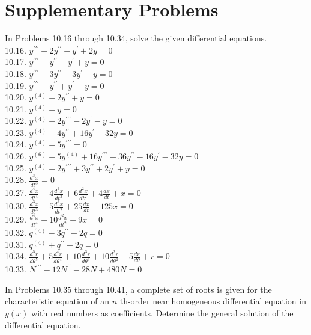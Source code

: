 \documentclass[10pt]{article}
\begin{document}
\section*{Supplementary Problems}
In Problems 10.16 through 10.34, solve the given differential equations.\\
10.16. $y^{\prime \prime \prime}-2 y^{\prime \prime}-y^{\prime}+2 y=0$\\
10.17. $y^{\prime \prime \prime}-y^{\prime \prime}-y^{\prime}+y=0$\\
10.18. $y^{\prime \prime \prime}-3 y^{\prime \prime}+3 y^{\prime}-y=0$\\
10.19. $y^{\prime \prime \prime}-y^{\prime \prime}+y^{\prime}-y=0$\\
10.20. $y^{(4)}+2 y^{\prime \prime}+y=0$\\
10.21. $y^{(4)}-y=0$\\
10.22. $y^{(4)}+2 y^{\prime \prime \prime}-2 y^{\prime}-y=0$\\
10.23. $y^{(4)}-4 y^{\prime \prime}+16 y^{\prime}+32 y=0$\\
10.24. $y^{(4)}+5 y^{\prime \prime \prime}=0$\\
10.26. $y^{(6)}-5 y^{(4)}+16 y^{\prime \prime \prime}+36 y^{\prime \prime}-16 y^{\prime}-32 y=0$\\
10.25. $y^{(4)}+2 y^{\prime \prime \prime}+3 y^{\prime \prime}+2 y^{\prime}+y=0$\\
10.28. $\frac{d^{3} x}{d t^{3}}=0$\\
10.27. $\frac{d^{4} x}{d t^{4}}+4 \frac{d^{3} x}{d t^{3}}+6 \frac{d^{2} x}{d t^{2}}+4 \frac{d x}{d t}+x=0$\\
10.30. $\frac{d^{3} x}{d t^{3}}-5 \frac{d^{2} x}{d t^{2}}+25 \frac{d x}{d t}-125 x=0$\\
10.29. $\frac{d^{4} x}{d t^{4}}+10 \frac{d^{2} x}{d t^{2}}+9 x=0$\\
10.32. $q^{(4)}-3 q^{\prime \prime}+2 q=0$\\
10.31. $q^{(4)}+q^{\prime \prime}-2 q=0$\\
10.34. $\frac{d^{5} r}{d \theta^{5}}+5 \frac{d^{4} r}{d \theta^{4}}+10 \frac{d^{3} r}{d \theta^{3}}+10 \frac{d^{2} r}{d \theta^{2}}+5 \frac{d r}{d \theta}+r=0$\\
10.33. $N^{\prime \prime \prime}-12 N^{\prime \prime}-28 N+480 N=0$

In Problems 10.35 through 10.41, a complete set of roots is given for the characteristic equation of an $n$ th-order near homogeneous differential equation in $y(x)$ with real numbers as coefficients. Determine the general solution of the differential equation.
\end{document}
